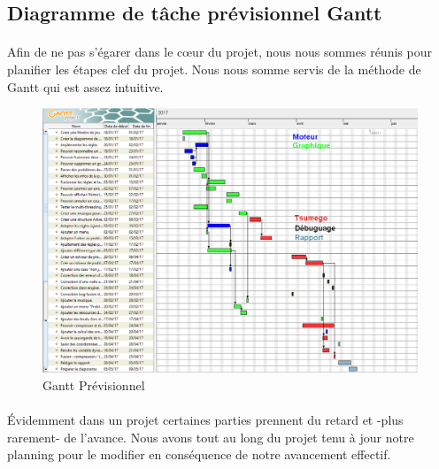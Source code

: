         \subsection{Diagramme de tâche prévisionnel Gantt}  
            \paragraph{}Afin de ne pas s'égarer dans le c\oe ur du projet, nous nous sommes réunis pour planifier les étapes clef du projet. Nous nous somme servis de la méthode de Gantt qui est assez intuitive. 
            
            \begin{figure}[h!]
            \centering
            \includegraphics[scale=0.30]{figures/experiments/gantt-previ.png}
            \caption{Gantt Prévisionnel}
            \label{fig:gantt1}
            \end{figure} 
            
            \paragraph{}Évidemment dans un projet certaines parties prennent du retard et -plus rarement- de l'avance. Nous avons tout au long du projet tenu à jour notre planning pour le modifier en conséquence de notre avancement effectif.
            
